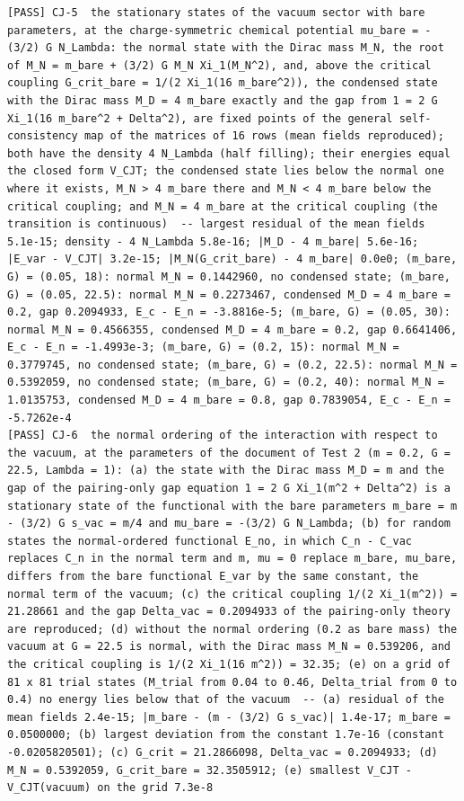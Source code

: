 \documentclass[
  10pt,
]{article}
\begin{document}
\begin{verbatim}
[PASS] CJ-5  the stationary states of the vacuum sector with bare parameters, at the charge-symmetric chemical potential mu_bare = -(3/2) G N_Lambda: the normal state with the Dirac mass M_N, the root of M_N = m_bare + (3/2) G M_N Xi_1(M_N^2), and, above the critical coupling G_crit_bare = 1/(2 Xi_1(16 m_bare^2)), the condensed state with the Dirac mass M_D = 4 m_bare exactly and the gap from 1 = 2 G Xi_1(16 m_bare^2 + Delta^2), are fixed points of the general self-consistency map of the matrices of 16 rows (mean fields reproduced); both have the density 4 N_Lambda (half filling); their energies equal the closed form V_CJT; the condensed state lies below the normal one where it exists, M_N > 4 m_bare there and M_N < 4 m_bare below the critical coupling; and M_N = 4 m_bare at the critical coupling (the transition is continuous)  -- largest residual of the mean fields 5.1e-15; density - 4 N_Lambda 5.8e-16; |M_D - 4 m_bare| 5.6e-16; |E_var - V_CJT| 3.2e-15; |M_N(G_crit_bare) - 4 m_bare| 0.0e0; (m_bare, G) = (0.05, 18): normal M_N = 0.1442960, no condensed state; (m_bare, G) = (0.05, 22.5): normal M_N = 0.2273467, condensed M_D = 4 m_bare = 0.2, gap 0.2094933, E_c - E_n = -3.8816e-5; (m_bare, G) = (0.05, 30): normal M_N = 0.4566355, condensed M_D = 4 m_bare = 0.2, gap 0.6641406, E_c - E_n = -1.4993e-3; (m_bare, G) = (0.2, 15): normal M_N = 0.3779745, no condensed state; (m_bare, G) = (0.2, 22.5): normal M_N = 0.5392059, no condensed state; (m_bare, G) = (0.2, 40): normal M_N = 1.0135753, condensed M_D = 4 m_bare = 0.8, gap 0.7839054, E_c - E_n = -5.7262e-4
[PASS] CJ-6  the normal ordering of the interaction with respect to the vacuum, at the parameters of the document of Test 2 (m = 0.2, G = 22.5, Lambda = 1): (a) the state with the Dirac mass M_D = m and the gap of the pairing-only gap equation 1 = 2 G Xi_1(m^2 + Delta^2) is a stationary state of the functional with the bare parameters m_bare = m - (3/2) G s_vac = m/4 and mu_bare = -(3/2) G N_Lambda; (b) for random states the normal-ordered functional E_no, in which C_n - C_vac replaces C_n in the normal term and m, mu = 0 replace m_bare, mu_bare, differs from the bare functional E_var by the same constant, the normal term of the vacuum; (c) the critical coupling 1/(2 Xi_1(m^2)) = 21.28661 and the gap Delta_vac = 0.2094933 of the pairing-only theory are reproduced; (d) without the normal ordering (0.2 as bare mass) the vacuum at G = 22.5 is normal, with the Dirac mass M_N = 0.539206, and the critical coupling is 1/(2 Xi_1(16 m^2)) = 32.35; (e) on a grid of 81 x 81 trial states (M_trial from 0.04 to 0.46, Delta_trial from 0 to 0.4) no energy lies below that of the vacuum  -- (a) residual of the mean fields 2.4e-15; |m_bare - (m - (3/2) G s_vac)| 1.4e-17; m_bare = 0.0500000; (b) largest deviation from the constant 1.7e-16 (constant -0.0205820501); (c) G_crit = 21.2866098, Delta_vac = 0.2094933; (d) M_N = 0.5392059, G_crit_bare = 32.3505912; (e) smallest V_CJT - V_CJT(vacuum) on the grid 7.3e-8

\end{verbatim}
\end{document}
